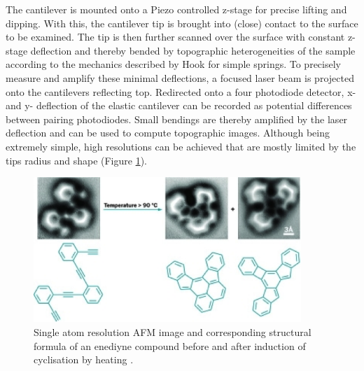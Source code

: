 \documentclass{article}
\begin{document}
The cantilever is mounted onto a Piezo controlled z-stage for precise lifting and dipping. With this, the cantilever tip is brought into (close) contact to the surface to be examined. The tip is then further scanned over the surface with constant z-stage deflection and thereby bended by topographic heterogeneities of the sample according to the mechanics described by Hook for simple springs. To precisely measure and amplify these minimal deflections, a focused laser beam is projected onto the cantilevers reflecting top. Redirected onto a four photodiode detector, x- and y- deflection of the elastic cantilever can be recorded as potential differences between pairing photodiodes. Small bendings are thereby amplified by the laser deflection and can be used to compute topographic images. Although being extremely simple, high resolutions can be achieved that are mostly limited by the tips radius and shape (Figure \ref{fig: atom resolution}).

\begin{figure}[htb!]
\centering
\includegraphics[width = 0.9\textwidth]{Figure3}
\caption{Single atom resolution AFM image and corresponding structural formula of an enediyne compound before and after induction of cyclisation by heating \cite{image3}.}\label{fig: atom resolution}
\end{figure}
\end{document}
